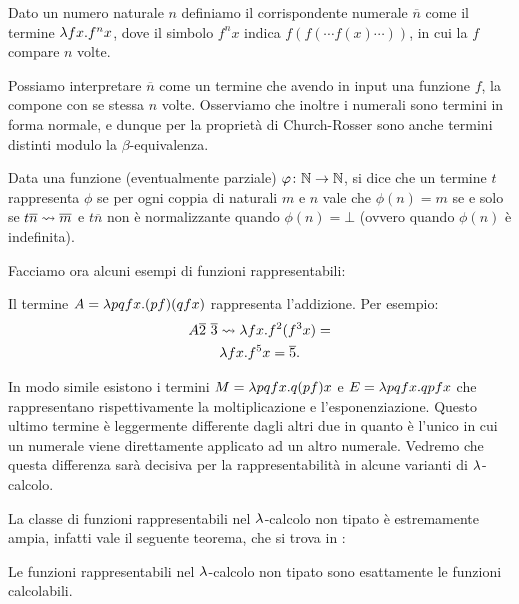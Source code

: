 \documentclass[]{marticle}
\begin{document}
\begin{block}[Definizione]
    Dato un numero naturale $n$ definiamo il corrispondente numerale
    $\overline{n}$ come il termine $\lambda f x. f^n x$, dove il simbolo $f^n x$
    indica $f(f(\cdots f(x) \cdots))$, in cui la $f$ compare $n$ volte.
\end{block}

Possiamo interpretare $\overline{n}$ come un termine che avendo in input una
funzione $f$, la compone con se stessa $n$ volte. Osserviamo che inoltre i
numerali sono termini in forma normale, e dunque per la propriet\`a di
Church-Rosser sono anche termini distinti modulo la $\beta$-equivalenza.

\begin{block}[Definizione]
    Data una funzione (eventualmente parziale) $\varphi\colon \mathbb{N} \rightarrow \mathbb{N}$,
    si dice che un termine $t$ rappresenta $\phi$ se per ogni coppia di naturali
    $m$ e $n$ vale che $\phi(n)=m$ se e solo se $t\overline{n}\rightsquigarrow\overline{m}$
    e $t\overline{n}$ non \`e normalizzante quando $\phi(n)=\bot$ (ovvero
    quando $\phi(n)$ \`e indefinita).
\end{block}

Facciamo ora alcuni esempi di funzioni rappresentabili:
\begin{block}[Esempio]
    Il termine $A = \lambda pq fx. (pf)(qfx)$ rappresenta l'addizione. Per esempio:
    \begin{gather*}
        A\overline{2}\ \overline{3} \rightsquigarrow \lambda fx. f^2 (f^3 x) = \\
        \lambda fx. f^5 x = \overline{5}.
    \end{gather*}

    In modo simile esistono i termini $M = \lambda p q f x. q (p f) x$ e $E = \lambda p q
    f x. qpfx$ che rappresentano rispettivamente la moltiplicazione e
    l'esponenziazione. Questo ultimo termine \`e leggermente differente dagli
    altri due in quanto \`e l'unico in cui un numerale viene direttamente
    applicato ad un altro numerale. Vedremo che questa differenza sar\`a
    decisiva per la rappresentabilit\`a in alcune varianti di $\lambda$-calcolo.
\end{block}

La classe di funzioni rappresentabili nel $\lambda$-calcolo non tipato \`e
estremamente ampia, infatti vale il seguente teorema, che si trova in
\cite{krivine}:
\begin{block}[Teorema]
    Le funzioni rappresentabili nel $\lambda$-calcolo non tipato sono esattamente le
    funzioni calcolabili.
\end{block}
\end{document}
